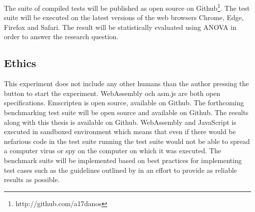 The suite of compiled tests will be published as open source on Github\footnote{http://github.com/a17danos}. The test suite will be executed on the latest versions of the web browsers Chrome, Edge, Firefox and Safari. The result will be statistically evaluated using ANOVA in order to answer the research question.

\subsection{Ethics}

This experiment does not include any other humans than the author pressing the button to start the experiment. WebAssembly och asm.js are both open specifications. Emscripten is open source, available on Github. The forthcoming benchmarking test suite will be open source and available on Github. The results along with this thesis is available on Github. WebAssembly and JavaScript is executed in sandboxed environment which means that even if there would be nefarious code in the test suite running the test suite would not be able to spread a computer virus or spy on the computer on which it was executed. The benchmark suite will be implemented based on best practices for implementing test cases such as the guidelines outlined by \textcite{CaiNerurkarWu1998} in an effort to provide as reliable results as possible.
